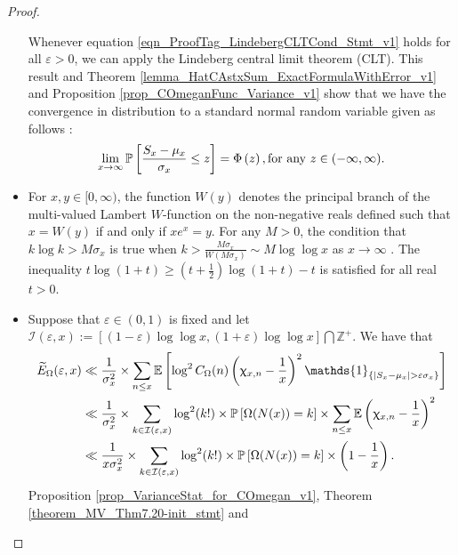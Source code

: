 \documentclass[11pt,reqno,a4letter]{article}
\newcommand{\hlocalref}[1]{\hyperref[#1]{\ref{#1}}}
\numberwithin{equation}{section}
\numberwithin{figure}{section}
\numberwithin{table}{section}
\renewcommand{\chi}{\upchi}
\theoremstyle{plain}
\numberwithin{theorem}{section}
\theoremstyle{definition}
\theoremstyle{remark}
\newcommand{\mathtext}[1]{\text{\rm #1}}
\begin{document}
\begin{proof}
\begin{itemize}
Whenever equation \eqref{eqn_ProofTag_LindebergCLTCond_Stmt_v1} holds for all $\varepsilon > 0$, 
we can apply the Lindeberg central limit theorem (CLT). This result and 
Theorem \hlocalref{lemma_HatCAstxSum_ExactFormulaWithError_v1} and 
Proposition \hlocalref{prop_COmeganFunc_Variance_v1} show that we have the 
convergence in distribution to a standard normal random variable given as follows 
\cite[\S 27]{BILLINGSLY-PROB-AND-MEASURE-BOOK}: 
\begin{equation}
\label{eqn_ProofTag_LindebergCLT_Conclusion_Stmt_v2}
\lim_{x \rightarrow \infty} 
     \mathbb{P}\left[\frac{S_x - \mu_x}{\sigma_x} \leq z\right] = 
	\Phi\left(z\right), \mathtext{ for any } z \in (-\infty, \infty).
\end{equation}
\item 
For $x,y \in [0, \infty)$, the function $W(y)$ 
denotes the principal branch of the multi-valued 
Lambert $W$-function on the non-negative reals defined such that 
$x = W(y)$ if and only if $xe^{x} = y$.
For any $M > 0$, the condition that $k\log k > M \sigma_x$ is true when 
$k > \frac{M \sigma_x}{W\left(M \sigma_x\right)} \sim M \log\log x$ 
as $x \rightarrow \infty$ \cite{LAMBERT-WFUNC-KNUTH}. 
The inequality $t \log(1+t) \geq \left(t + \frac{1}{2}\right) \log(1+t) - t$ 
is satisfied for all real $t > 0$. 
\item 
Suppose that $\varepsilon \in (0, 1)$ is fixed and 
let $\mathcal{I}(\varepsilon, x) := \left[(1-\varepsilon) \log\log x, (1+\varepsilon) \log\log x \right] \bigcap \mathbb{Z}^{+}$. 
We have that 
\begin{align} 
\notag
\widetilde{E}_{\Omega}(\varepsilon, x) & \ll 
     \frac{1}{\sigma_x^2} \times \sum_{n \leq x} \mathbb{E}\left[
     \log^2 C_{\Omega}(n) \left(\chi_{x,n} - \frac{1}{x}\right)^2 
     \mathds{1}_{\left\{\left\lvert S_x - \mu_x \right\rvert > \varepsilon\sigma_x\right\}}
     \right] \\ 
\notag
     & \ll \frac{1}{\sigma_x^2} \times \sum_{k \in \mathcal{I}(\varepsilon, x)} 
     \log^2(k!) \times \mathbb{P}\left[\Omega(N(x)) = k\right] \times \sum_{n \leq x} 
     \mathbb{E}\left(\chi_{x,n} - \frac{1}{x}\right)^2 \\ 
\label{eqn_ProofTag_CLT_VerifyLindebergCondition_v1_v3}
     & \ll \frac{1}{x \sigma_x^2} \times \sum_{k \in \mathcal{I}(\varepsilon, x)} 
     \log^2(k!) \times \mathbb{P}\left[\Omega(N(x)) = k\right] \times \left(1 - \frac{1}{x}\right). 
\end{align}
Proposition \hlocalref{prop_VarianceStat_for_COmegan_v1}, 
Theorem \hlocalref{theorem_MV_Thm7.20-init_stmt} and 

\end{itemize}
\end{proof}
\end{document}
